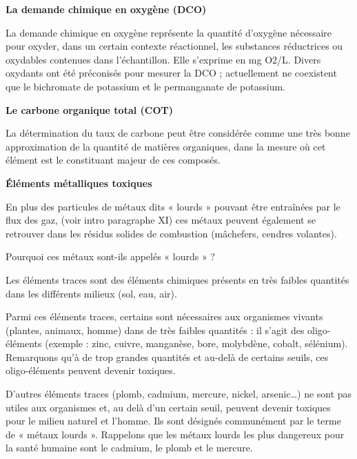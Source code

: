 \textbf{La demande chimique en oxygène (DCO)}
\vspace{0.3cm}

La demande chimique en oxygène représente la quantité d’oxygène nécessaire pour oxyder, dans un certain contexte réactionnel, les substances réductrices ou oxydables contenues dans l’échantillon. Elle s’exprime en mg O2/L.
Divers oxydants ont été préconisés pour mesurer la DCO ; actuellement ne coexistent que le bichromate de potassium et le permanganate de potassium.

\vspace{0.3cm}

\textbf{Le carbone organique total (COT)}
\vspace{0.3cm}

La détermination du taux de carbone peut être considérée comme une très bonne approximation de la quantité de matières organiques, dans la mesure où cet élément est le constituant majeur de ces composés.

\vspace{0.3cm}

\textbf{Éléments métalliques toxiques}
\vspace{0.3cm}

En plus des particules de métaux dits « lourds » pouvant être entraînées par le flux des gaz, (voir intro paragraphe XI) ces métaux peuvent également se retrouver dans les résidus solides de combustion (mâchefers, cendres volantes).

\vspace{0.3cm}

Pourquoi ces métaux sont-ils appelés « lourds » ?
\vspace{0.3cm}

Les éléments traces sont des éléments chimiques présents en très faibles quantités dans les différents milieux (sol, eau, air).
\vspace{0.3cm}

Parmi ces éléments traces, certains sont nécessaires aux organismes vivants (plantes, animaux, homme) dans de très faibles quantités : il s’agit des oligo-éléments (exemple : zinc, cuivre, manganèse, bore, molybdène, cobalt, sélénium). Remarquons qu’à de trop grandes quantités et au-delà de certains seuils, ces oligo-éléments peuvent devenir toxiques.
\vspace{0.3cm}

D’autres éléments traces (plomb, cadmium, mercure, nickel, arsenic…) ne sont pas utiles aux organismes et, au delà d’un certain seuil, peuvent devenir toxiques pour le milieu naturel et l’homme. Ils sont désignés communément par le terme de « métaux lourds ». Rappelons que les métaux lourds les plus dangereux pour la santé humaine sont le cadmium, le plomb et le mercure.
\vspace{0.3cm}

